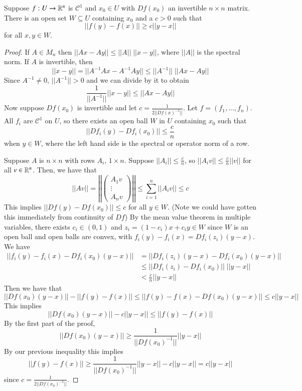 \begin{lem}
    Suppose $f:U\rightarrow \mathbb R^n$ is $\mathcal{C}^1$ and $x_0 \in U$ with $Df(x_0)$ an invertible $n\times n$ matrix. There is an open set $W \subseteq U$ containing $x_0$ and a $c > 0$ such that $$||f(y) - f(x)||\geq c||y-x||$$ for all $x,y \in W$.
\end{lem}
\begin{proof}
    If $A \in M_n$ then $||Ax-Ay|| \leq ||A||\;||x-y||$, where $||A||$ is the spectral norm. If $A$ is invertible, then $$||x-y|| = ||A^{-1}Ax - A^{-1}Ay|| \leq ||A^{-1}||\;||Ax-Ay||$$ Since $A^{-1} \neq 0$, $||A^{-1}|| > 0$ and we can divide by it to obtain $$\frac{1}{||A^{-1}||}||x-y|| \leq ||Ax-Ay||$$ Now suppose $Df(x_0)$ is invertible and let $c = \frac{1}{2||Df(x)^{-1}||}$. Let $f = (f_1,...,f_n)$. All $f_i$ are $\mathcal{C}^1$ on $U$, so there exists an open ball $W$ in $U$ containing $x_0$ such that $$||Df_i(y) - Df_i(x_0)|| \leq \frac{c}{n}$$ when $y \in W$, where the left hand side is the spectral or operator norm of a row. 

    Suppose $A$ is $n\times n$ with rows $A_i$, $1\times n$. Suppose $||A_i|| \leq \frac{c}{n}$, so $||A_iv|| \leq \frac{c}{n}||v||$ for all $v \in \mathbb R^n$. Then, we have that \begin{equation*}
        ||Av|| = \left|\left|\begin{pmatrix} A_1v \\ \vdots \\ A_nv\end{pmatrix}\right|\right| \leq \sum_{i=1}^n||A_iv|| \leq c
    \end{equation*}
    This implies $||Df(y) - Df(x_0)|| \leq c$ for all $y \in W$. (Note we could have gotten this immediately from continuity of $Df$) By the mean value theorem in multiple variables, there exists $c_i \in (0,1)$ and $z_i = (1-c_i)x+c_iy \in W$ since $W$ is an open ball and open balls are convex, with $f_i(y)-f_i(x) = Df_i(z_i)(y-x)$. We have \begin{align*}
        ||f_i(y) - f_i(x) - Df_i(x_0)(y-x)|| &= ||Df_i(z_i)(y-x) - Df_i(x_0)(y-x)|| \\
        &\leq ||Df_i(z_i)-Df_i(x_0)||\;||y-x|| \\
        &< \frac{c}{n}||y-x||
    \end{align*}
    Then we have that $$||Df(x_0)(y-x)|| - ||f(y)-f(x)|| \leq ||f(y) - f(x)-Df(x_0)(y-x)|| \leq c||y-x||$$ This implies $$||Df(x_0)(y-x)||-c||y-x|| \leq ||f(y)-f(x)||$$ By the first part of the proof, $$||Df(x_0)(y-x)|| \geq \frac{1}{||Df(x_0)^{-1}||}||y-x||$$ By our previous inequality this implies $$||f(y) - f(x)|| \geq \frac{1}{||Df(x_0)^{-1}||}||y-x|| - c||y-x|| = c||y-x||$$ since $c = \frac{1}{2||Df(x_0)^{-1}||}$.
\end{proof}

